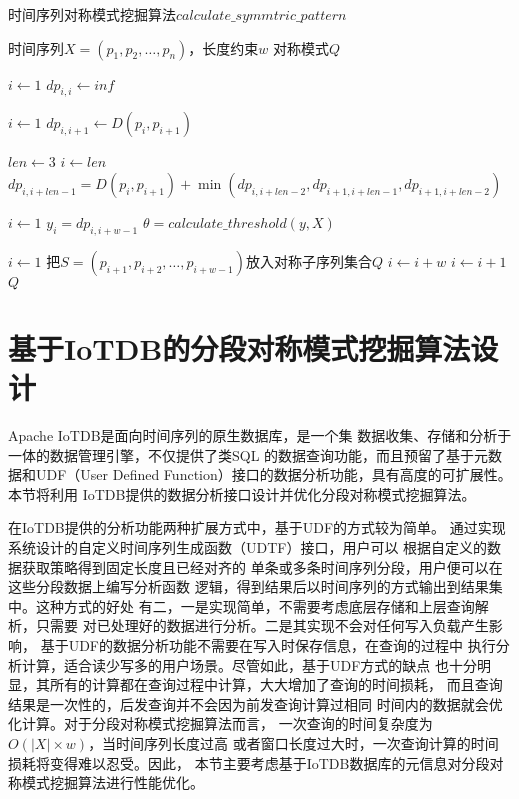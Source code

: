 \begin{algorithm}
  \caption{时间序列对称模式挖掘算法$calculate\_symmtric\_pattern$}
  \label{alg:symmetric_pattern}
  \small
  \begin{algorithmic}
    \REQUIRE 时间序列$X=\left(p_{1}, p_{2}, \dots, p_{n}\right)$，长度约束$w$
    \ENSURE 对称模式$Q$

    \STATE $i \leftarrow 1$
    \STATE $dp_{i,i} \leftarrow inf$
    \ENDWHILE

    \STATE $i \leftarrow 1$
    \STATE $dp_{i,i+1} \leftarrow D\left(p_{i}, p_{i+1}\right)$
    \ENDWHILE

    \STATE $len \leftarrow 3$
    \STATE $i \leftarrow len$
    \STATE $dp_{i,i+len-1} = D\left(p_{i}, p_{i+1}\right)+\min \left(dp_{i,i+len-2},dp_{i+1,i+len-1},dp_{i+1,i+len-2}\right)$
    \ENDWHILE
    \ENDWHILE

    \STATE $i \leftarrow 1$
    \STATE $y_i=dp_{i,i+w-1}$
    \ENDWHILE
    \STATE $\theta = calculate\_threshold\left(y,X\right)$

    \STATE $i \leftarrow 1$
    \STATE 把$S=\left(p_{i+1}, p_{i+2}, \dots, p_{i+w-1}\right)$放入对称子序列集合$Q$
    \STATE $i \leftarrow i+w$
    \ELSE
    \STATE $i \leftarrow i+1$
    \ENDIF
    \ENDWHILE
    \RETURN $Q$
  \end{algorithmic}
\end{algorithm}

\section{基于IoTDB的分段对称模式挖掘算法设计}

Apache IoTDB是面向时间序列的原生数据库，是一个集
数据收集、存储和分析于一体的数据管理引擎，不仅提供了类SQL
的数据查询功能，而且预留了基于元数据和UDF（User Defined 
Function）接口的数据分析功能，具有高度的可扩展性。本节将利用
IoTDB提供的数据分析接口设计并优化分段对称模式挖掘算法。

在IoTDB提供的分析功能两种扩展方式中，基于UDF的方式较为简单。
通过实现系统设计的自定义时间序列生成函数（UDTF）接口，用户可以
根据自定义的数据获取策略得到固定长度且已经对齐的
单条或多条时间序列分段，用户便可以在这些分段数据上编写分析函数
逻辑，得到结果后以时间序列的方式输出到结果集中。这种方式的好处
有二，一是实现简单，不需要考虑底层存储和上层查询解析，只需要
对已处理好的数据进行分析。二是其实现不会对任何写入负载产生影响，
基于UDF的数据分析功能不需要在写入时保存信息，在查询的过程中
执行分析计算，适合读少写多的用户场景。尽管如此，基于UDF方式的缺点
也十分明显，其所有的计算都在查询过程中计算，大大增加了查询的时间损耗，
而且查询结果是一次性的，后发查询并不会因为前发查询计算过相同
时间内的数据就会优化计算。对于分段对称模式挖掘算法而言，
一次查询的时间复杂度为$O(|X| \times w)$，当时间序列长度过高
或者窗口长度过大时，一次查询计算的时间损耗将变得难以忍受。因此，
本节主要考虑基于IoTDB数据库的元信息对分段对称模式挖掘算法进行性能优化。

